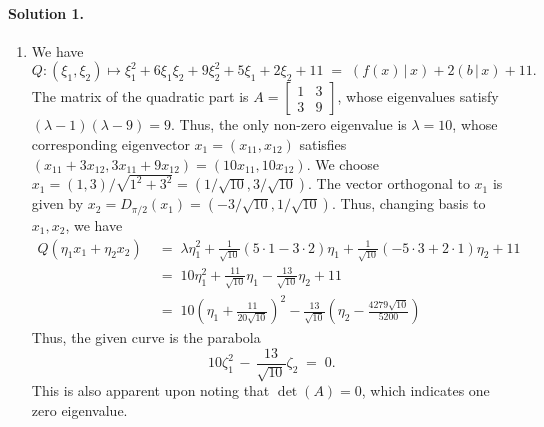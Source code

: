 \documentclass[10pt]{article}
\begin{document}
        \paragraph{Solution 1.}
        \begin{enumerate}
                \item 
                We have
                \[Q\colon (\xi_1, \xi_2) \mapsto \xi_1^2 + 6\xi_1\xi_2 + 9\xi_2^2 + 5\xi_1 + 2\xi_2 + 11
                \;=\; (f(x) \,|\, x) + 2(b\,|\,x) + 11.\]
                The matrix of the quadratic part is $ A =
                \begin{bmatrix}
                        1& 3 \\ 3& 9
                \end{bmatrix}$, whose eigenvalues satisfy $(\lambda - 1)(\lambda - 9) = 9$. Thus, the only non-zero eigenvalue is $\lambda = 10$,
                whose corresponding eigenvector $x_1 = (x_{11}, x_{12})$ satisfies $(x_{11} + 3x_{12}, 3x_{11} + 9x_{12}) = (10x_{11}, 10x_{12})$.
                We choose $x_1 = (1, 3) / \sqrt{1^2 + 3^2} = (1 /\sqrt{10}, 3 /\sqrt{10})$.
                The vector orthogonal to $x_1$ is given by $x_2 = D_{\pi/2}(x_1) = (-3 /\sqrt{10}, 1 /\sqrt{10})$.
                Thus, changing basis to $x_1, x_2$, we have
                \begin{align*}
                Q(\eta_1x_1 + \eta_2x_2)
                        \;&=\; \lambda\eta_1^2 + \frac{1}{\sqrt{10}}(5\cdot 1 - 3\cdot 2)\eta_1 + \frac{1}{\sqrt{10}}(-5\cdot 3 + 2\cdot 1)\eta_2 + 11 \\
                        \;&=\; 10\eta_1^2 + \frac{11}{\sqrt{10}}\eta_1 - \frac{13}{\sqrt{10}}\eta_2 + 11 \\
                        \;&=\; 10\left(\eta_1 + \frac{11}{20\sqrt{10}}\right)^2 - \frac{13}{\sqrt{10}}\left(\eta_2 - \frac{4279\sqrt{10}}{5200}\right)
                \end{align*}
                Thus, the given curve is the parabola
                \[
                10\zeta_1^2 \,-\, \frac{13}{\sqrt{10}}\zeta_2 \;=\; 0.
                \]
                This is also apparent upon noting that $\det(A) = 0$, which indicates one zero eigenvalue.
                


\end{enumerate}
\end{document}
